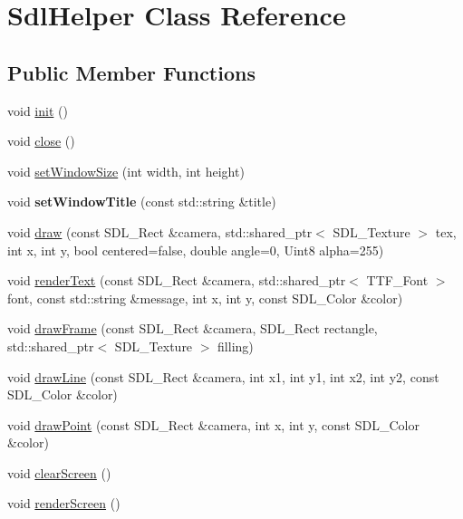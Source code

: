\hypertarget{class_sdl_helper}{}\section{Sdl\+Helper Class Reference}
\label{class_sdl_helper}
\subsection*{Public Member Functions}
\begin{DoxyCompactItemize}
\item 
void \hyperlink{class_sdl_helper_a5957d7221b7c676f7f70a062142fb4d1}{init} ()
\item 
void \hyperlink{class_sdl_helper_a1ae537f9fcbd4d7413d3b9dfb6834eb0}{close} ()
\item 
void \hyperlink{class_sdl_helper_a634d651da332b1ce3d4ee5b052612d73}{set\+Window\+Size} (int width, int height)
\item 
\hypertarget{class_sdl_helper_a7e7c3f1d8b45240f454b54255287c6e9}{}void {\bfseries set\+Window\+Title} (const std\+::string \&title)\label{class_sdl_helper_a7e7c3f1d8b45240f454b54255287c6e9}

\item 
void \hyperlink{class_sdl_helper_a28e57527d36b934585bf8132c738bfc6}{draw} (const S\+D\+L\+\_\+\+Rect \&camera, std\+::shared\+\_\+ptr$<$ S\+D\+L\+\_\+\+Texture $>$ tex, int x, int y, bool centered=false, double angle=0, Uint8 alpha=255)
\item 
void \hyperlink{class_sdl_helper_a3468e637caaa6c543bf1c9fc6fcfaf82}{render\+Text} (const S\+D\+L\+\_\+\+Rect \&camera, std\+::shared\+\_\+ptr$<$ T\+T\+F\+\_\+\+Font $>$ font, const std\+::string \&message, int x, int y, const S\+D\+L\+\_\+\+Color \&color)
\item 
void \hyperlink{class_sdl_helper_a98adc9e9575222133bb0020a483ca55e}{draw\+Frame} (const S\+D\+L\+\_\+\+Rect \&camera, S\+D\+L\+\_\+\+Rect rectangle, std\+::shared\+\_\+ptr$<$ S\+D\+L\+\_\+\+Texture $>$ filling)
\item 
void \hyperlink{class_sdl_helper_a178dda0c392db8104050be846e091226}{draw\+Line} (const S\+D\+L\+\_\+\+Rect \&camera, int x1, int y1, int x2, int y2, const S\+D\+L\+\_\+\+Color \&color)
\item 
void \hyperlink{class_sdl_helper_aed4ce26d1a354281b46877d19caacec1}{draw\+Point} (const S\+D\+L\+\_\+\+Rect \&camera, int x, int y, const S\+D\+L\+\_\+\+Color \&color)
\item 
void \hyperlink{class_sdl_helper_a483e3f2df3950db06f8096cb31d34134}{clear\+Screen} ()
\item 
void \hyperlink{class_sdl_helper_a526243a9976dd1e3464c91da44bfe7f1}{render\+Screen} ()
\end{DoxyCompactItemize}
